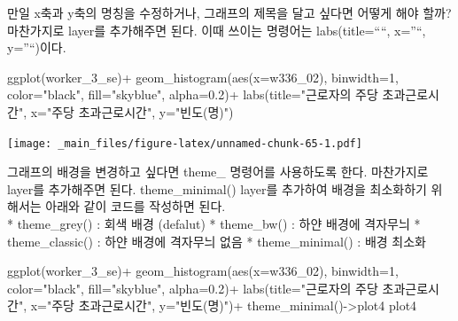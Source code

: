 \documentclass[
]{book}
\newenvironment{Shaded}{\begin{snugshade}}{\end{snugshade}}
\newcommand{\AttributeTok}[1]{\textcolor[rgb]{0.77,0.63,0.00}{#1}}
\newcommand{\DecValTok}[1]{\textcolor[rgb]{0.00,0.00,0.81}{#1}}
\newcommand{\FloatTok}[1]{\textcolor[rgb]{0.00,0.00,0.81}{#1}}
\newcommand{\FunctionTok}[1]{\textcolor[rgb]{0.00,0.00,0.00}{#1}}
\newcommand{\NormalTok}[1]{#1}
\newcommand{\OtherTok}[1]{\textcolor[rgb]{0.56,0.35,0.01}{#1}}
\newcommand{\SpecialCharTok}[1]{\textcolor[rgb]{0.00,0.00,0.00}{#1}}
\newcommand{\StringTok}[1]{\textcolor[rgb]{0.31,0.60,0.02}{#1}}
\theoremstyle{definition}
\theoremstyle{definition}
\theoremstyle{definition}
\theoremstyle{definition}
\theoremstyle{remark}
\begin{document}
만일 x축과 y축의 명칭을 수정하거나, 그래프의 제목을 달고 싶다면 어떻게 해야 할까? 마찬가지로 layer를 추가해주면 된다. 이때 쓰이는 명령어는 labs(title=````, x=''``, y=''``)이다.

\begin{Shaded}
\begin{Highlighting}[]
\FunctionTok{ggplot}\NormalTok{(worker\_3\_se)}\SpecialCharTok{+}
  \FunctionTok{geom\_histogram}\NormalTok{(}\FunctionTok{aes}\NormalTok{(}\AttributeTok{x=}\NormalTok{w336\_02), }\AttributeTok{binwidth=}\DecValTok{1}\NormalTok{, }\AttributeTok{color=}\StringTok{"black"}\NormalTok{, }\AttributeTok{fill=}\StringTok{"skyblue"}\NormalTok{, }\AttributeTok{alpha=}\FloatTok{0.2}\NormalTok{)}\SpecialCharTok{+}
  \FunctionTok{labs}\NormalTok{(}\AttributeTok{title=}\StringTok{"근로자의 주당 초과근로시간"}\NormalTok{, }\AttributeTok{x=}\StringTok{"주당 초과근로시간"}\NormalTok{, }\AttributeTok{y=}\StringTok{"빈도(명)"}\NormalTok{)}
\end{Highlighting}
\end{Shaded}

\texttt{[image: \_main\_files/figure-latex/unnamed-chunk-65-1.pdf]}

그래프의 배경을 변경하고 싶다면 theme\_ 명령어를 사용하도록 한다. 마찬가지로 layer를 추가해주면 된다. theme\_minimal() layer를 추가하여 배경을 최소화하기 위해서는 아래와 같이 코드를 작성하면 된다.\\
* theme\_grey() : 회색 배경 (defalut)
* theme\_bw() : 하얀 배경에 격자무늬
* theme\_classic() : 하얀 배경에 격자무늬 없음
* theme\_minimal() : 배경 최소화

\begin{Shaded}
\begin{Highlighting}[]
\FunctionTok{ggplot}\NormalTok{(worker\_3\_se)}\SpecialCharTok{+}
  \FunctionTok{geom\_histogram}\NormalTok{(}\FunctionTok{aes}\NormalTok{(}\AttributeTok{x=}\NormalTok{w336\_02), }\AttributeTok{binwidth=}\DecValTok{1}\NormalTok{, }\AttributeTok{color=}\StringTok{"black"}\NormalTok{, }\AttributeTok{fill=}\StringTok{"skyblue"}\NormalTok{, }\AttributeTok{alpha=}\FloatTok{0.2}\NormalTok{)}\SpecialCharTok{+}
  \FunctionTok{labs}\NormalTok{(}\AttributeTok{title=}\StringTok{"근로자의 주당 초과근로시간"}\NormalTok{, }\AttributeTok{x=}\StringTok{"주당 초과근로시간"}\NormalTok{, }\AttributeTok{y=}\StringTok{"빈도(명)"}\NormalTok{)}\SpecialCharTok{+}
  \FunctionTok{theme\_minimal}\NormalTok{()}\OtherTok{{-}\textgreater{}}\NormalTok{plot4}
\NormalTok{plot4}
\end{Highlighting}
\end{Shaded}
\end{document}
